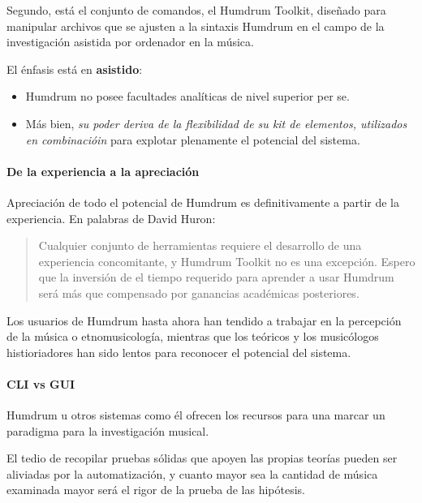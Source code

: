 \documentclass[]{article}
\let\oldparagraph\paragraph
\renewcommand{\paragraph}[1]{\oldparagraph{#1}\mbox{}}
\begin{document}
Segundo, está el conjunto de comandos, el Humdrum Toolkit, diseñado para
manipular archivos que se ajusten a la sintaxis Humdrum en el campo de
la investigación asistida por ordenador en la música.

El énfasis está en \textbf{asistido}:

\begin{itemize}
\item
  Humdrum no posee facultades analíticas de nivel superior per se.
\item
  Más bien, \emph{su poder deriva de la flexibilidad de su kit de
  elementos, utilizados en combinacióin} para explotar plenamente el
  potencial del sistema.
\end{itemize}

\hypertarget{de-la-experiencia-a-la-apreciaciuxf3n}{%
\paragraph{De la experiencia a la
apreciación}\label{de-la-experiencia-a-la-apreciaciuxf3n}}

Apreciación de todo el potencial de Humdrum es definitivamente a partir
de la experiencia. En palabras de David Huron:

\begin{quote}
Cualquier conjunto de herramientas requiere el desarrollo de una
experiencia concomitante, y Humdrum Toolkit no es una excepción. Espero
que la inversión de el tiempo requerido para aprender a usar Humdrum
será más que compensado por ganancias académicas posteriores.
\end{quote}

Los usuarios de Humdrum hasta ahora han tendido a trabajar en la
percepción de la música o etnomusicología, mientras que los teóricos y
los musicólogos histioriadores han sido lentos para reconocer el
potencial del sistema.

\hypertarget{cli-vs-gui}{%
\paragraph{CLI vs GUI}\label{cli-vs-gui}}

Humdrum u otros sistemas como él ofrecen los recursos para una marcar un
paradigma para la investigación musical.

El tedio de recopilar pruebas sólidas que apoyen las propias teorías
pueden ser aliviadas por la automatización, y cuanto mayor sea la
cantidad de música examinada mayor será el rigor de la prueba de las
hipótesis.
\end{document}

